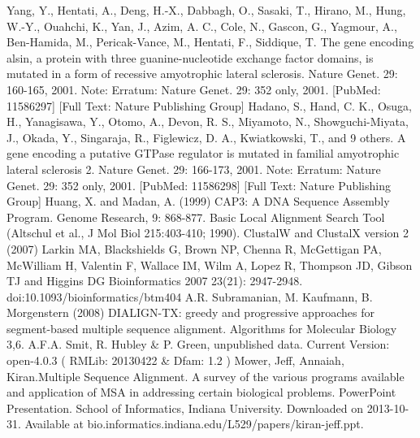 \documentclass[11pt]{article} %
\begin{document}
\begin{thebibliography}{99}
{  Yang, Y., Hentati, A., Deng, H.-X., Dabbagh, O., Sasaki, T., Hirano, M., Hung, W.-Y., Ouahchi, K., Yan, J., Azim, A. C., Cole, N.,
  Gascon, G., Yagmour, A., Ben-Hamida, M., Pericak-Vance, M., Hentati, F., Siddique, T. The gene encoding alsin, a protein with three
  guanine-nucleotide exchange factor domains, is mutated in a form of recessive amyotrophic lateral sclerosis. Nature Genet. 29: 160-165,
  2001. Note: Erratum: Nature Genet. 29: 352 only, 2001. [PubMed: 11586297] [Full Text: Nature Publishing Group]
  Hadano, S., Hand, C. K., Osuga, H., Yanagisawa, Y., Otomo, A., Devon, R. S., Miyamoto, N., Showguchi-Miyata, J., Okada, Y., Singaraja,
  R., Figlewicz, D. A., Kwiatkowski, T., and 9 others. A gene encoding a putative GTPase regulator is mutated in familial amyotrophic
  lateral sclerosis 2. Nature Genet. 29: 166-173, 2001. Note: Erratum: Nature Genet. 29: 352 only, 2001. [PubMed: 11586298] [Full Text:
  Nature Publishing Group]
  Huang, X. and Madan, A. (1999) CAP3: A DNA Sequence Assembly Program. Genome Research, 9: 868-877.
  Basic Local Alignment Search Tool (Altschul et al., J Mol Biol 215:403-410; 1990).
  ClustalW and ClustalX version 2 (2007) Larkin MA, Blackshields G, Brown NP, Chenna R, McGettigan PA, McWilliam H, Valentin F, 
  Wallace IM, Wilm A, Lopez R, Thompson JD, Gibson TJ and Higgins DG Bioinformatics 2007 23(21): 2947-2948.
  doi:10.1093/bioinformatics/btm404 
  A.R. Subramanian, M. Kaufmann, B. Morgenstern (2008)
  DIALIGN-TX: greedy and progressive approaches for segment-based multiple sequence alignment.
  Algorithms for Molecular Biology 3,6.
 A.F.A. Smit, R. Hubley \& P. Green, unpublished data. Current Version: open-4.0.3 ( RMLib: 20130422 \& Dfam: 1.2 )
  Mower, Jeff, Annaiah, Kiran.Multiple Sequence Alignment. A survey of the various programs available and application of MSA in
  addressing certain biological problems. PowerPoint Presentation. School of Informatics, Indiana University. Downloaded on
  2013-10-31. Available at bio.informatics.indiana.edu/L529/papers/kiran-jeff.ppt.
}
\end{thebibliography}
\end{document}
